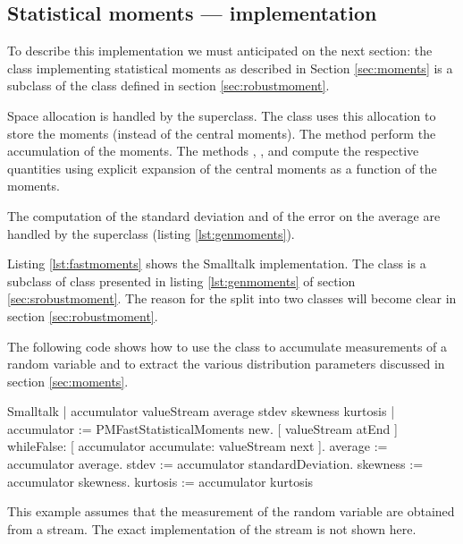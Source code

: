 \subsection{Statistical moments --- implementation}
To describe this implementation we must anticipated on the next section: the class  implementing statistical moments as described in Section \ref{sec:moments} is a subclass of the class
defined in section \ref{sec:robustmoment}.

Space allocation is handled by the superclass.
The class  uses this allocation to store the moments
(instead of the central moments).
The method  perform the accumulation of the moments.
The methods , ,  and  compute the respective quantities using explicit expansion of the central moments as a function of the moments.

The computation of the standard deviation and of the error on the
average are handled by the superclass (\cf listing \ref{lst:genmoments}).

\label{sec:smoments}Listing \ref{lst:fastmoments} shows the
Smalltalk implementation.
The class  is a subclass of class  presented in listing \ref{lst:genmoments} of section \ref{sec:srobustmoment}.
The reason for the split into two classes will become clear in section \ref{sec:robustmoment}.

The following code shows how to use the class  to accumulate measurements of a random variable and to extract the various distribution parameters
discussed in section \ref{sec:moments}.

\begin{displaycode}{Smalltalk}
| accumulator valueStream average stdev skewness kurtosis |
accumulator := PMFastStatisticalMoments new.
[ valueStream atEnd ]
        whileFalse: [ accumulator accumulate: valueStream next ].
average := accumulator average.
stdev := accumulator standardDeviation.
skewness := accumulator skewness.
kurtosis := accumulator kurtosis
\end{displaycode}

This example assumes that the measurement of the random variable
are obtained from a stream.
The exact implementation of the stream is not shown here.

